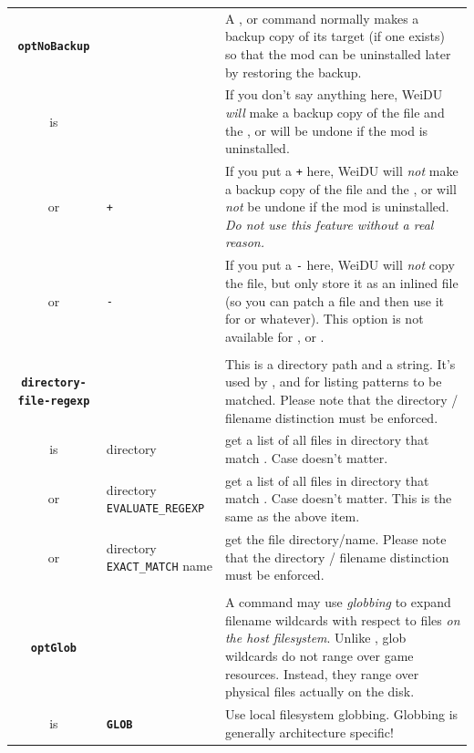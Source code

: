 \documentclass{article}
\def\ttref#1{\ahrefloc{#1}{\tt #1}}
\def\DEFINE#1{{\tt \bf #1}\label{#1}\index{#1}}
\def\t#1{{\tt #1}}
\begin{document}
\begin{tabular}{cp{10in}|p{10in}}
\\

\DEFINE{optNoBackup} & &
  A \ttref{COPY}, \ttref{MOVE} or \ttref{DELETE} command normally makes a backup copy of its target (if one
  exists) so that the mod can be uninstalled later by restoring the backup.
  \\

  is &   & If you don't say anything here, WeiDU {\em will} make a backup
           copy of the file and the \ttref{COPY}, \ttref{MOVE} or \ttref{DELETE} will be undone if the mod
           is uninstalled. \\
  or & \t{+} & If you put a \t{+} here, WeiDU will {\em not} make a backup
           copy of the file and the \ttref{COPY}, \ttref{MOVE} or \ttref{DELETE} will {\em not} be
           undone if the mod is uninstalled. {\em Do not use this feature without
			a real reason.} \\
  or & \t{-} & If you put a \t{-} here, WeiDU will {\em not} copy the file,
           but only store it as an inlined file (so you can patch a file and
           then use it for \ttref{EXTEND_BOTTOM (TP2)} or whatever).
           This option is not available for \ttref{COPY_LARGE}, \ttref{MOVE} or \ttref{DELETE}. \\
\\

\DEFINE{directory-file-regexp} & & This is a directory path and a \ttref{regexp} string.
It's used by \ttref{MAKE_BIFF}, \ttref{ACTION_BASH_FOR} and \ttref{PATCH_BASH_FOR}
for listing patterns to be matched. Please note that
the directory / filename distinction must be enforced. \\
is & directory \ttref{regexp} & get a list of all files in directory that match \ttref{regexp}.
Case doesn't matter. \\
or & directory \t{EVALUATE_REGEXP} \ttref{regexp} & get a list of all files in directory that match \ttref{regexp}.
Case doesn't matter. This is the same as the above item. \\
or & directory \t{EXACT_MATCH} name & get the file directory/name. Please note that
the directory / filename distinction must be enforced. \\

\\
\DEFINE{optGlob} & &
  A \ttref{COPY} command may use \emph{globbing} to expand filename
  wildcards with respect to files \emph{on the host filesystem}. Unlike
  \ttref{COPY_EXISTING_REGEXP}, glob wildcards do not range over game
  resources. Instead, they range over physical files actually on the disk.
  \\
  is & \DEFINE{GLOB} & Use local filesystem globbing. Globbing is
  generally architecture specific!


\end{tabular}
\end{document}
